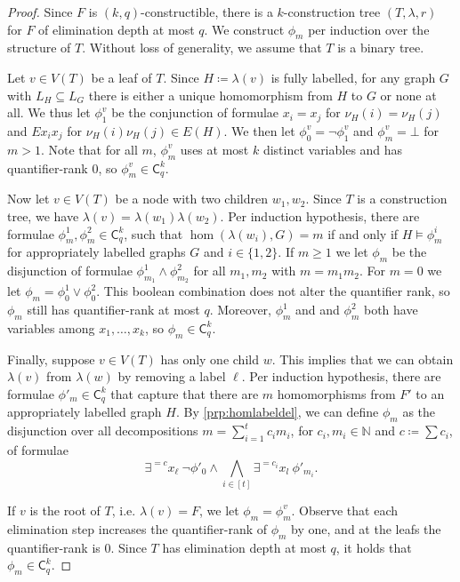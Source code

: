 \documentclass[10pt,a4paper]{article}
\newcommand{\N}{\ensuremath{\mathbb{N}}}
\newcommand{\lC} {\ensuremath{\mathsf C}}
\newcommand{\elimOrd}[2]{$(#1,#2)$-constructible}
\newcommand{\elimDepth}{elimination depth}
\begin{document}
\begin{proof}
    Since $F$ is \elimOrd{k}{q}, there is a $k$-construction tree $(T, \lambda, r)$ for $F$ of \elimDepth{} at most $q$. We construct $\phi_m$ per induction over the structure of $T$. Without loss of generality, we assume that $T$ is a binary tree.

    Let $v \in V(T)$ be a leaf of $T$. Since $H \coloneqq \lambda(v)$ is fully labelled, for any graph $G$ with $L_{H} \subseteq L_G$ there is either a unique homomorphism from $H$ to
$G$ or none at all. We thus let $\phi_1^v$ be the conjunction of formulae $x_i = x_j$ for $\nu_{H}(i) = \nu_{H}(j)$ and $Ex_ix_j$ for $\nu_{H}(i)\nu_{H}(j) \in E(H)$. We then let $\phi^v_0 = \neg \phi^v_1$ and $\phi^v_m = \bot$ for $m > 1$. Note that for all $m$, $\phi^v_m$ uses at most $k$ distinct variables and has quantifier-rank $0$, so $\phi_m^v \in \lC^k_q$.

    Now let $v \in V(T)$ be a node with two children $w_1, w_2$. Since $T$ is a construction tree, we have $\lambda(v) = \lambda(w_1)\lambda(w_2)$. Per induction hypothesis, there are formulae $\phi^1_m, \phi^2_m \in \lC^k_q$, such that $\hom(\lambda(w_i), G) = m$ if and only if $H \models \phi^i_m$ for appropriately labelled graphs $G$ and $i \in \{1,2\}$. If $m \geq 1$ we let $\phi_m$ be the disjunction of formulae $\phi^1_{m_1} \land \phi^2_{m_2}$ for all $m_1, m_2$ with $m = m_1m_2$. For $m = 0$ we let $\phi_m = \phi^1_0 \lor \phi^2_0$. This boolean combination does not alter the quantifier rank, so $\phi_m$ still has quantifier-rank at most $q$. Moreover, $\phi^1_m$ and and $\phi^2_m$ both have variables among $x_1, \dots, x_k$, so $\phi_m \in \lC^k_q$.

    Finally, suppose $v \in V(T)$ has only one child $w$. This implies that we can obtain $\lambda(v)$ from $\lambda(w)$ by removing a label $\ell$. Per induction hypothesis, there are formulae $\phi'_m \in \lC^k_q$ that capture that there are $m$ homomorphisms from $F'$ to an appropriately labelled graph $H$. By \cref{prp:homlabeldel}, we can define $\phi_m$ as the disjunction over all decompositions $m = \sum_{i=1}^t c_im_i$, for $c_i, m_i \in \N$ and $c \coloneqq \sum c_i$, of formulae
    \begin{equation*}
      \exists^{= c} x_\ell ~\neg\phi'_0 \land \bigwedge_{i \in [t]} \exists^{=c_i}x_l ~\phi'_{m_i}.
\end{equation*}

    If $v$ is the root of $T$, i.e. $\lambda(v) = F$, we let $\phi_m = \phi_m^v$.
    Observe that each elimination step increases the quantifier-rank of $\phi_m$ by one, and at the leafs the quantifier-rank is 0. Since $T$ has \elimDepth{} at most $q$, it holds that $\phi_m \in \lC^k_q$.
  \end{proof}
\end{document}
